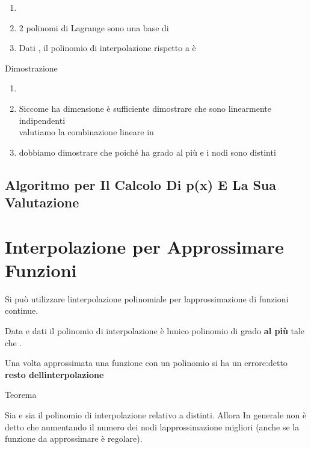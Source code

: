 \documentclass[
]{article}
\providecommand{\tightlist}{%
  \setlength{\itemsep}{0pt}\setlength{\parskip}{0pt}}
\begin{document}
\begin{enumerate}
\tightlist
\item
  {}
\item
  2 polinomi di Lagrange sono una base di {}
\item
  Dati {}, il polinomio di interpolazione rispetto a {} è
\end{enumerate}

{}

Dimostrazione

\begin{enumerate}
\tightlist
\item
  {}
\end{enumerate}

{}

\begin{enumerate}
\setcounter{enumi}{1}
\item
  Siccome {} ha dimensione {} è sufficiente dimostrare che sono
  linearmente indipendenti\\
  {}valutiamo la combinazione lineare in {}\\
  {}
\item
  {} dobbiamo dimostrare che {} poiché {} ha grado al più {} e i nodi
  sono distinti\\
  {}
\end{enumerate}

\hypertarget{algoritmo-per-il-calcolo-di-px-e-la-sua-valutazione}{%
\subsection{Algoritmo per Il Calcolo Di p(x) E La Sua
Valutazione}\label{algoritmo-per-il-calcolo-di-px-e-la-sua-valutazione}}

{}

\hypertarget{interpolazione-per-approssimare-funzioni}{%
\section{Interpolazione per Approssimare
Funzioni}\label{interpolazione-per-approssimare-funzioni}}

Si può utilizzare l\textquotesingle interpolazione polinomiale per
l\textquotesingle approssimazione di funzioni continue.

Data {} e dati {} il polinomio di interpolazione è
l\textquotesingle unico polinomio di grado \textbf{al più {}} tale che
{}.

Una volta approssimata una funzione {} con un polinomio {} si ha un
errore:{}detto \textbf{resto dell\textquotesingle interpolazione}

Teorema

Sia {} e sia {} il polinomio di interpolazione relativo a {} distinti.
Allora {} {}In generale non è detto che aumentando il numero dei nodi
l\textquotesingle approssimazione migliori (anche se la funzione da
approssimare è regolare).
\end{document}
